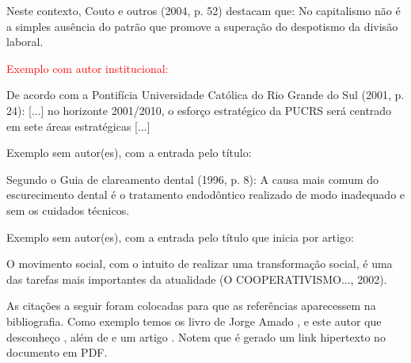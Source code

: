 Neste contexto, Couto e outros (2004, p. 52) destacam que: {\textquotedbl}No
capitalismo não é a simples ausência do
patrão que promove a superação do despotismo da divisão
laboral.{\textquotedbl}\\

\bigskip

{\sffamily
	\textrm{\textcolor{red}{Exemplo com autor institucional: }}}

\bigskip

De acordo com a Pontifícia Universidade Católica do Rio Grande do Sul (2001, p.
24): {\textquotedbl}[...] no horizonte 2001/2010, o esforço estratégico da
PUCRS será centrado em sete áreas estratégicas [...]{\textquotedbl}\\

\bigskip

{\color{red}
	Exemplo sem autor(es), com a entrada pelo título:}

\bigskip

Segundo o Guia de clareamento dental (1996, p. 8): {\textquotedbl}A causa mais
comum do escurecimento dental é o tratamento endodôntico realizado de modo
inadequado e sem os cuidados técnicos.{\textquotedbl}\\

\bigskip

{\color{red}
	Exemplo sem autor(es), com a entrada pelo título que inicia por
	artigo:}

\bigskip

O movimento social, com o intuito de realizar uma transformação social, é uma
das tarefas mais importantes da atualidade
(O COOPERATIVISMO..., 2002).\\

\bigskip

As citações a seguir foram colocadas para que as referências aparecessem na
bibliografia. Como exemplo temos os livro de Jorge Amado \cite{book:AMADO}
\cite{book:AMADO2}, e este autor que desconheço \cite{book:OHANSSON}, além de
\cite{book:ENGEL} e um artigo \cite{art:PRADO}. Notem que é gerado um link
hipertexto no documento em PDF.
